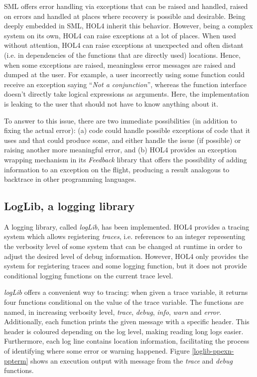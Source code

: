 \documentclass{kththesis}
\begin{document}
{\gls{SML} offers error handling via exceptions that can be raised and handled, raised on errors and handled at places where recovery is possible and desirable. Being deeply embedded in SML, HOL4 inherit this behavior. However, being a complex system on its own, HOL4 can raise exceptions at a lot of places. When used without attention, HOL4 can raise exceptions at unexpected and often distant (i.e. in dependencies of the functions that are directly used) locations. Hence, when some exceptions are raised, meaningless error messages are raised and dumped at the user. For example, a user incorrectly using some function could receive an exception saying ``\textit{Not a conjunction}'', whereas the function interface doesn't directly take logical expressions as arguments. Here, the implementation is leaking to the user that should not have to know anything about it.

To answer to this issue, there are two immediate possibilities (in addition to fixing the actual error): (a) code could handle possible exceptions of code that it uses and that could produce some, and either handle the issue (if possible) or raising another more meaningful error, and (b) HOL4 provides an exception wrapping mechanism in its \textit{Feedback} library that offers the possibility of adding information to an exception on the flight, producing a result analogous to backtrace in other programming languages.

\subsection{LogLib, a logging library} \label{loglib}

A logging library, called \textit{logLib}, has been implemented. HOL4 provides a tracing system which allows registering \textit{traces}, i.e. references to an integer representing the verbosity level of some system that can be changed at runtime in order to adjust the desired level of debug information. However, HOL4 only provides the system for registering traces and some logging function, but it does not provide conditional logging functions on the current trace level.

\textit{logLib} offers a convenient way to tracing: when given a trace variable, it returns four functions conditional on the value of the trace variable. The functions are named, in increasing verbosity level, \textit{trace}, \textit{debug}, \textit{info}, \textit{warn} and \textit{error}. Additionally, each function prints the given message with a specific header. This header is coloured depending on the log level, making reading long logs easier. Furthermore, each log line contains location information, facilitating the process of identifying where some error or warning happened. Figure \ref{loglib-ppexn-ppterm} shows an execution output with message from the \textit{trace} and \textit{debug} functions.

}
\end{document}
